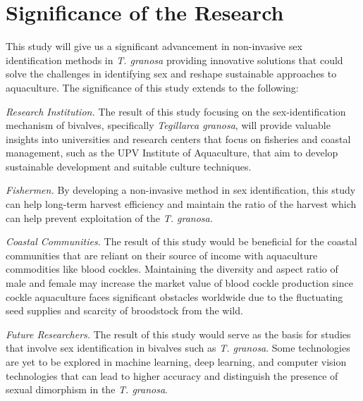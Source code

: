 \section{Significance of the Research}
\label{sec:significance}

This study will give us a significant advancement in non-invasive sex identification methods in \textit{T. granosa} providing innovative solutions that could solve the challenges in identifying sex and reshape sustainable approaches to aquaculture. The significance of this study extends to the following:

 \textit{Research Institution.} The result of this study focusing on the sex-identification mechanism of bivalves, specifically \textit{Tegillarca granosa}, will provide valuable insights into universities and research centers that focus on fisheries and coastal management, such as the UPV Institute of Aquaculture, that aim to develop sustainable development and suitable culture techniques.

 \textit{Fishermen.} By developing a non-invasive method in sex identification, this study can help long-term harvest efficiency and maintain the ratio of the harvest which can help prevent exploitation of the \textit{T. granosa.}

 \textit{Coastal Communities.} The result of this study would be beneficial for the coastal communities that are reliant on their source of income with aquaculture commodities like blood cockles. Maintaining the diversity and aspect ratio of male and female may increase the market value of blood cockle production since cockle aquaculture faces significant obstacles worldwide due to the fluctuating seed supplies and scarcity of broodstock from the wild. 

 \textit{Future Researchers.} The result of this study would serve as the basis for studies that involve sex identification in bivalves such as \textit{T. granosa}. Some technologies are yet to be explored in machine learning, deep learning, and computer vision technologies that can lead to higher accuracy and distinguish the presence of sexual dimorphism in the \textit{T. granosa}.


